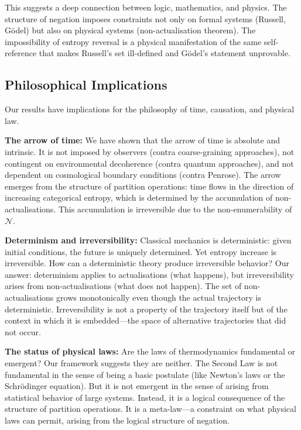 \documentclass[twocolumn,10pt]{article}
\theoremstyle{definition}
\theoremstyle{remark}
\begin{document}
This suggests a deep connection between logic, mathematics, and physics. The structure of negation imposes constraints not only on formal systems (Russell, Gödel) but also on physical systems (non-actualisation theorem). The impossibility of entropy reversal is a physical manifestation of the same self-reference that makes Russell's set ill-defined and Gödel's statement unprovable.

\subsection{Philosophical Implications}

Our results have implications for the philosophy of time, causation, and physical law.

\textbf{The arrow of time:} We have shown that the arrow of time is absolute and intrinsic. It is not imposed by observers (contra coarse-graining approaches), not contingent on environmental decoherence (contra quantum approaches), and not dependent on cosmological boundary conditions (contra Penrose). The arrow emerges from the structure of partition operations: time flows in the direction of increasing categorical entropy, which is determined by the accumulation of non-actualisations. This accumulation is irreversible due to the non-enumerability of $\mathcal{N}$.

\textbf{Determinism and irreversibility:} Classical mechanics is deterministic: given initial conditions, the future is uniquely determined. Yet entropy increase is irreversible. How can a deterministic theory produce irreversible behavior? Our answer: determinism applies to actualisations (what happens), but irreversibility arises from non-actualisations (what does not happen). The set of non-actualisations grows monotonically even though the actual trajectory is deterministic. Irreversibility is not a property of the trajectory itself but of the context in which it is embedded—the space of alternative trajectories that did not occur.

\textbf{The status of physical laws:} Are the laws of thermodynamics fundamental or emergent? Our framework suggests they are neither. The Second Law is not fundamental in the sense of being a basic postulate (like Newton's laws or the Schrödinger equation). But it is not emergent in the sense of arising from statistical behavior of large systems. Instead, it is a logical consequence of the structure of partition operations. It is a meta-law—a constraint on what physical laws can permit, arising from the logical structure of negation.
\end{document}
